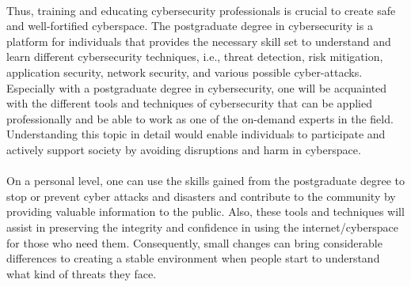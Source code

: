 \paragraph{}
Thus, training and educating cybersecurity professionals is crucial to create safe and well-fortified cyberspace. The postgraduate degree in cybersecurity is a platform for individuals that provides the necessary skill set to understand and learn different cybersecurity techniques, i.e., threat detection, risk mitigation, application security, network security, and various possible cyber-attacks. Especially with a postgraduate degree in cybersecurity, one will be acquainted with the different tools and techniques of cybersecurity that can be applied professionally and be able to work as one of the on-demand experts in the field. Understanding this topic in detail would enable individuals to participate and actively support society by avoiding disruptions and harm in cyberspace.

\paragraph{}
On a personal level, one can use the skills gained from the postgraduate degree to stop or prevent cyber attacks and disasters and contribute to the community by providing valuable information to the public. Also, these tools and techniques will assist in preserving the integrity and confidence in using the internet/cyberspace for those who need them. Consequently, small changes can bring considerable differences to creating a stable environment when people start to understand what kind of threats they face.
